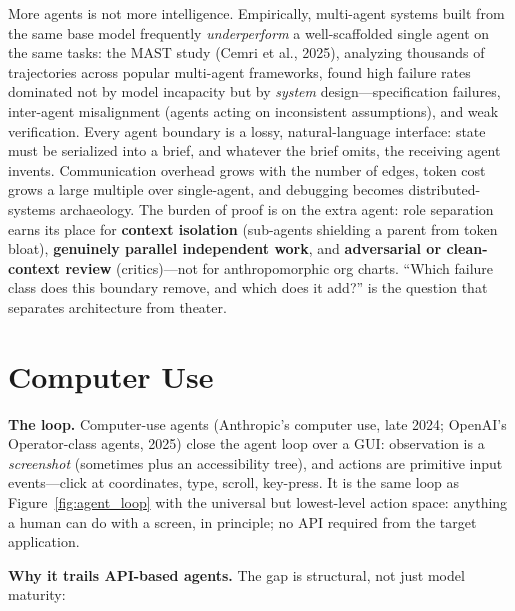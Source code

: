 \begin{warningbox}
More agents is not more intelligence. Empirically, multi-agent systems built from the same base model frequently \textit{underperform} a well-scaffolded single agent on the same tasks: the MAST study (Cemri et al., 2025), analyzing thousands of trajectories across popular multi-agent frameworks, found high failure rates dominated not by model incapacity but by \textit{system} design---specification failures, inter-agent misalignment (agents acting on inconsistent assumptions), and weak verification. Every agent boundary is a lossy, natural-language interface: state must be serialized into a brief, and whatever the brief omits, the receiving agent invents. Communication overhead grows with the number of edges, token cost grows a large multiple over single-agent, and debugging becomes distributed-systems archaeology. The burden of proof is on the extra agent: role separation earns its place for \textbf{context isolation} (sub-agents shielding a parent from token bloat), \textbf{genuinely parallel independent work}, and \textbf{adversarial or clean-context review} (critics)---not for anthropomorphic org charts. ``Which failure class does this boundary remove, and which does it add?'' is the question that separates architecture from theater.
\end{warningbox}

\section{Computer Use}
\label{sec:computer_use}

\textbf{The loop.} Computer-use agents (Anthropic's computer use, late 2024; OpenAI's Operator-class agents, 2025) close the agent loop over a GUI: observation is a \textit{screenshot} (sometimes plus an accessibility tree), and actions are primitive input events---click at coordinates, type, scroll, key-press. It is the same loop as Figure~\ref{fig:agent_loop} with the universal but lowest-level action space: anything a human can do with a screen, in principle; no API required from the target application.

\textbf{Why it trails API-based agents.} The gap is structural, not just model maturity:

